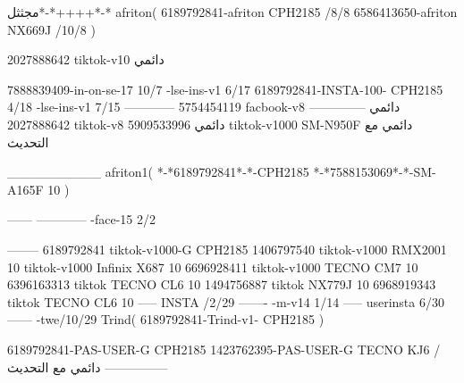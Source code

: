 مجثثل*-*++++*-*
afriton(
6189792841-afriton CPH2185  /8/8
6586413650-afriton NX669J  /10/8
)

2027888642 tiktok-v10
دائمي

7888839409-in-on-se-17 10/7
-lse-ins-v1 6/17
6189792841-INSTA-100- CPH2185 4/18
-lse-ins-v1 7/15
------------
5754454119 facbook-v8
دائمي
--------------
2027888642 tiktok-v8
دائمي
5909533996 tiktok-v1000  SM-N950F
دائمي مع التحديث

__________
afriton1(
*-*6189792841*-*-CPH2185
*-*7588153069*-*-SM-A165F 10
)


------
------------
-face-15 2/2

--------
6189792841 tiktok-v1000-G CPH2185 
1406797540 tiktok-v1000  RMX2001 10 tiktok-v1000  Infinix X687 10
6696928411 tiktok-v1000  TECNO CM7 10
6396163313 tiktok   TECNO CL6 10
1494756887 tiktok   NX779J 10
6968919343 tiktok   TECNO CL6 10
-----
 INSTA /2/29
-------
-m-v14 1/14
-----
userinsta 6/30
------
-twe/10/29
Trind(
6189792841-Trind-v1- CPH2185 
)


6189792841-PAS-USER-G CPH2185 
1423762395-PAS-USER-G TECNO KJ6  /دائمي مع التحديث
    ---------------
